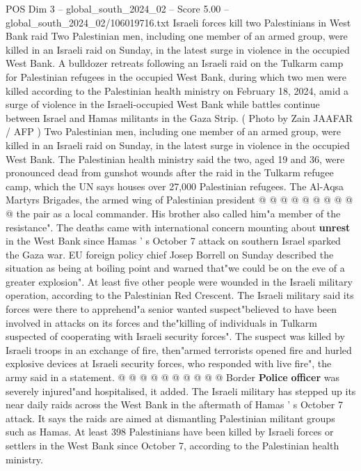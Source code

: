 \begin{textsample}{POS Dim 3 – global\_south\_2024\_02 – Score 5.00 – global\_south\_2024\_02/106019716.txt}  \label{ex:f3_pos_366}
Israeli forces kill two Palestinians in West Bank raid Two Palestinian men, including one member of an armed group, were killed in an Israeli raid on Sunday, in the latest surge in violence in the occupied West Bank.
A bulldozer retreats following an Israeli raid on the Tulkarm camp for Palestinian refugees in the occupied West Bank, during which two men were killed according to the Palestinian health ministry on February 18, 2024, amid a surge of violence in the Israeli-occupied West Bank while battles continue between Israel and Hamas militants in the Gaza Strip. ( Photo by Zain JAAFAR / AFP ) Two Palestinian men, including one member of an armed group, were killed in an Israeli raid on Sunday, in the latest surge in violence in the occupied West Bank.
The Palestinian health ministry said the two, aged 19 and 36, were pronounced dead from gunshot wounds after the raid in the Tulkarm refugee camp, which the UN says houses over 27,000 Palestinian refugees.
The Al-Aqsa Martyrs Brigades, the armed wing of Palestinian president @ @ @ @ @ @ @ @ @ @ the pair as a local commander.
His brother also called him"a member of the resistance".
The deaths came with international concern mounting about \textbf{unrest} in the West Bank since Hamas ' s October 7 attack on southern Israel sparked the Gaza war.
EU foreign policy chief Josep Borrell on Sunday described the situation as being at boiling point and warned that"we could be on the eve of a greater explosion".
At least five other people were wounded in the Israeli military operation, according to the Palestinian Red Crescent.
The Israeli military said its forces were there to apprehend"a senior wanted suspect"believed to have been involved in attacks on its forces and the"killing of individuals in Tulkarm suspected of cooperating with Israeli security forces".
The suspect was killed by Israeli troops in an exchange of fire, then"armed terrorists opened fire and hurled explosive devices at Israeli security forces, who responded with live fire", the army said in a statement. @ @ @ @ @ @ @ @ @ @ Border \textbf{Police} \textbf{officer} was severely injured"and hospitalised, it added.
The Israeli military has stepped up its near daily raids across the West Bank in the aftermath of Hamas ' s October 7 attack.
It says the raids are aimed at dismantling Palestinian militant groups such as Hamas.
At least 398 Palestinians have been killed by Israeli forces or settlers in the West Bank since October 7, according to the Palestinian health ministry.

\end{textsample}
